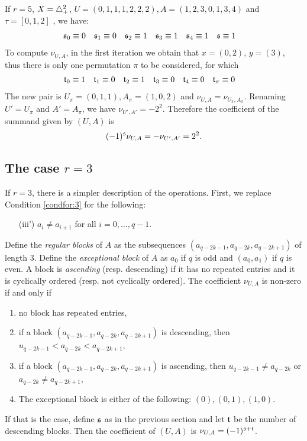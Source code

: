 \begin{example}
	If $r=5$, $X= \triangle_{+}^2$, $U = (0,1,1,1,2,2,2), A = (1,2,3,0,1,3,4)$ and $\tau = [0,1,2]$ , we have:
	\begin{align*}
		\mathfrak{s}_0 &\equiv 0
		&
		\mathfrak{s}_1 &\equiv 0
		&
		\mathfrak{s}_2 &\equiv 1
		&
		\mathfrak{s}_3 &\equiv 1
		&
		\mathfrak{s}_4 &\equiv 1
		&
		\mathfrak{s} &\equiv 1
	\end{align*}
	To compute $\nu_{U,A}$, in the first iteration we obtain that $x=(0,2)$, $y=(3)$, thus there is only one permutation $\pi$ to be considered, for which
	\begin{align*}
		\mathfrak{t}_0 &\equiv 1
		&
		\mathfrak{t}_1 &\equiv 0
		&
		\mathfrak{t}_2 &\equiv 1
		&
		\mathfrak{t}_3 &\equiv 0
		&
		\mathfrak{t}_4 &\equiv 0
		&
		\mathfrak{t}_{\pi} &\equiv 0
	\end{align*}
	The new pair is $U_{\pi} = (0,1,1), A_\pi = (1,0,2)$ and $\nu_{U,A} = \nu_{U_\pi,A_\pi}$. Renaming $U' = U_\pi$ and $A' = A_\pi$, we have $\nu_{U',A'} = -2^2$. Therefore the coefficient of the summand given by $(U,A)$ is
	\[
		(-1)^{\mathfrak{s}} \nu_{U,A} = -\nu_{U',A'} = 2^2.
	\]
\end{example}

\subsection{The case \texorpdfstring{$r=3$}{r = 3}} If $r=3$, there is a simpler description of the operations. First, we replace Condition \eqref{condfor:3} for the following:
\begin{itemize}
	\item[(iii')] $a_i\neq a_{i+1}$ for all $i=0,\ldots,q-1$.
\end{itemize}
Define the \emph{regular blocks} of $A$ as the subsequences $(a_{q-2k-1},a_{q-2k},a_{q-2k+1})$ of length $3$. Define the \emph{exceptional block} of $A$ as $a_0$ if $q$ is odd and $(a_0,a_1)$ if $q$ is even. A block is \emph{ascending} (resp. descending) if it has no repeated entries and it is cyclically ordered (resp. not cyclically ordered). The coefficient $\nu_{U,A}$ is non-zero if and only if
\begin{enumerate}
	\item no block has repeated entries,
	\item if a block $(a_{q-2k-1},a_{q-2k},a_{q-2k+1})$ is descending, then $u_{q-2k-1}<a_{q-2k}<a_{q-2k+1}$,
	\item if a block $(a_{q-2k-1},a_{q-2k},a_{q-2k+1})$ is ascending, then $u_{q-2k-1}\neq a_{q-2k}$ or $a_{q-2k}\neq a_{q-2k+1}$,
	\item The exceptional block is either of the following: $(0),(0,1),(1,0)$.
\end{enumerate} 
If that is the case, define $\mathfrak{s}$ as in the previous section and let $\mathfrak{t}$ be the number of descending blocks. Then the coefficient of $(U,A)$ is $\nu_{U,A} = (-1)^{\mathfrak{s}+\mathfrak{t}}$.

